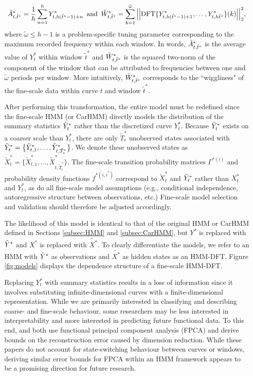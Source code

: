 \begin{equation}
    \label{eqn:z}
    \Zone_{t,\tilde{t}^*} = \frac{1}{h}\sum_{n=1}^{h}Y^*_{t,h(\tilde{t}^*-1)+n} \enspace \text{and} \enspace \Ztwo_{t,\tilde{t}^*} = \sum_{k=1}^{\tilde{\omega}}\Big|\Big|\mathrm{DFT}\{Y^*_{t,h(\tilde{t}^*-1)+1},\ldots, Y^*_{t,h\tilde{t}^*}\}(k)\Big|\Big|_2^2,
\end{equation}
%
where $\tilde{\omega} \leq h-1$ is a problem-specific tuning parameter corresponding to the maximum recorded frequency within each window. In words, $\tilde{A}^*_{t,\tilde{t}^*}$ is the average value of $Y^*_t$ within window $\tilde{t}^*$ and $\tilde{W}^*_{t,\tilde{t}^*}$ is the squared two-norm of the component of the window that can be attributed to frequencies between one and $\tilde{\omega}$ periods per window. More intuitively, $\tilde{W}^*_{t,\tilde{t}^*}$ corresponds to the ``wiggliness" of the fine-scale data within curve $t$ and window $\tilde{t}^*$.

After performing this transformation, the entire model must be redefined since the fine-scale HMM (or CarHMM) directly models the distribution of the summary statistics $\tilde{Y}^*_t$ rather than the discretized curve $Y^*_t$. Because $\tilde{Y}^*_t$ exists on a coarser scale than $Y^*_t$, there are only $\tilde{T}_t^*$ unobserved states associated with $\tilde{Y}^*_t = \big\{\tilde{Y}^*_{t,1},\ldots, \tilde{Y}^*_{t,\tilde{T}^*_t}\big\}$. We denote these unobserved states as $\tilde{X}^*_t = \big\{\tilde{X}^*_{t,1},\ldots, \tilde{X}^*_{t,\tilde{T}^*_t}\big\}$. The fine-scale transition probability matrices $\Gamma^{*(i)}$ and probability density functions $f^{*(i,i^*)}$ correspond to $\tilde{X}^*_t$ and $\tilde{Y}^*_t$ rather than $X^*_t$ and $Y^*_t$, as do all fine-scale model assumptions (e.g., conditional independence, autoregressive structure between observations, etc.) Fine-scale model selection and validation should therefore be adjusted accordingly. 

The likelihood of this model is identical to that of the original HMM or CarHMM defined in Sections \ref{subsec:HMM} and \ref{subsec:CarHMM}, but $Y^*$ is replaced with $\tilde{Y}^*$ and $X^*$ is replaced with $\tilde{X^*}$. To clearly differentiate the models, we refer to an HMM with $\tilde{Y}^*$ as observations and $\tilde{X^*}$ as hidden states as an HMM-DFT. Figure \ref{fig:models} displays the dependence structure of a fine-scale HMM-DFT.

Replacing $Y^*_t$ with summary statistics results in a loss of information since it involves substituting infinite-dimensional curves with a finite-dimensional representation. While we are primarily interested in classifying and describing coarse- and fine-scale behaviour, some researchers may be less interested in interpretability and more interested in predicting future functional data. To this end, \citet{Aue:2015} and \citet{Gao:2019} both use functional principal component analysis (FPCA) and derive bounds on the reconstruction error caused by dimension reduction. While these papers do not account for state-switching behaviour between curves or windows, deriving similar error bounds for FPCA within an HMM framework appears to be a promising direction for future research. 

